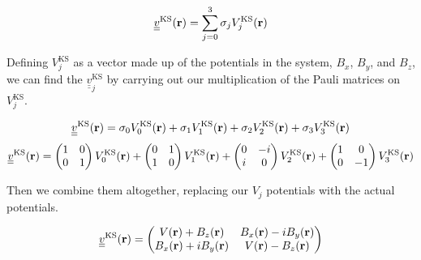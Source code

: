 \documentclass[10pt]{revtex4-1}
\newcommand{\bfr}{{\bf r}}
\begin{document}
\begin{equation}
  \underline{\underline{v}}^{\text{KS}}(\bfr) = \sum^3_{j=0} \sigma_j V_j^{\text{KS}}(\bfr)
\end{equation}

Defining $V_j^{\text{KS}}$ as a vector made up of the potentials in the system, $B_x$, $B_y$, and $B_z$, we can find the $\underline{\underline{v}}^{\text{KS}}_j$ by carrying out our multiplication of the Pauli matrices on $V_j^{\text{KS}}$.

\begin{equation*}
  \underline{\underline{v}}^{\text{KS}}(\bfr) = \sigma_0 V_0^{\text{KS}}(\bfr) + \sigma_1 V_1^{\text{KS}}(\bfr) + \sigma_2 V_2^{\text{KS}}(\bfr) + \sigma_3 V_3^{\text{KS}}(\bfr)
\end{equation*}
\begin{equation*}
  \underline{\underline{v}}^{\text{KS}}(\bfr) =
  \begin{pmatrix}
    1 & 0 \\
    0 & 1 \\
  \end{pmatrix}
  V_0^{\text{KS}}(\bfr) +
  \begin{pmatrix}
    0 & 1 \\
    1 & 0 \\
  \end{pmatrix}
  V_1^{\text{KS}}(\bfr) +
  \begin{pmatrix}
    0 & -i \\
    i & 0 \\
  \end{pmatrix}
  V_2^{\text{KS}}(\bfr) +
  \begin{pmatrix}
    1 & 0 \\
    0 & -1 \\
  \end{pmatrix}
  V_3^{\text{KS}}(\bfr)
\end{equation*}

Then we combine them altogether, replacing our $V_j$ potentials with the actual potentials.

\begin{equation*}
  \underline{\underline{v}}^{\text{KS}}(\bfr) =
  \begin{pmatrix}
    V(\bfr) + B_z(\bfr) & B_x(\bfr) - iB_y(\bfr) \\
    B_x(\bfr) + iB_y(\bfr) & V(\bfr) - B_z(\bfr) \\
  \end{pmatrix}
\end{equation*}
\end{document}
